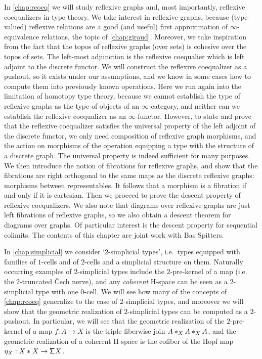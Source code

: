 In \cref{chap:rcoeq} we will study reflexive graphs and, most importantly, reflexive coequalizers in type theory. We take interest in reflexive graphs, because (type-valued) reflexive relations are a good (and useful) first approximation of $\infty$-equivalence relations, the topic of \cref{chap:giraud}. Moreover, we take inspiration from the fact that the topos of reflexive graphs (over sets) is cohesive over the topos of sets. The left-most adjunction is the reflexive coequalier which is left adjoint to the discrete functor. We will construct the reflexive coequalizer as a pushout, so it exists under our assumptions, and we know in some cases how to compute them into previously known operations. Here we run again into the limitation of homotopy type theory, because we cannot establish the type of reflexive graphs as the type of objects of an $\infty$-category, and neither can we establish the reflexive coequalizer as an $\infty$-functor. However, to state and prove that the reflexive coequalizer satisfies the universal property of the left adjoint of the discrete functor, we only need composition of reflexive graph morphisms, and the action on morphisms of the operation equipping a type with the structure of a discrete graph. The universal property is indeed sufficient for many purposes. We then introduce the notion of fibrations for reflexive graphs, and show that the fibrations are right orthogonal to the same maps as the discrete reflexive graphs: morphisms between representables. It follows that a morphism is a fibration if and only if it is cartesian. Then we proceed to prove the descent property of reflexive coequalizers. We also note that diagrams over reflexive graphs are just left fibrations of reflexive graphs, so we also obtain a descent theorem for diagrams over graphs. Of particular interest is the descent property for sequential colimits. The contents of this chapter are joint work with Bas Spitters.

In \cref{chap:simplicial} we consider `$2$-simplicial types', i.e.~types equipped with families of $1$-cells and of $2$-cells and a simplicial structure on them. Naturally occurring examples of $2$-simplicial types include the $2$-pre-kernel of a map (i.e. the $2$-truncated \v Cech nerve), and any \emph{coherent} H-space can be seen as a $2$-simplicial type with one $0$-cell. We will see how many of the concepts of \cref{chap:rcoeq} generalize to the case of $2$-simplicial types, and moreover we will show that the geometric realization of $2$-simplicial types can be computed as a $2$-pushout. In particular, we will see that the geometric realization of the $2$-pre-kernel of a map $f:A\to X$ is the triple fiberwise join $\join[X]{A}{\join[X]{A}{A}}$, and the geometric realization of a coherent H-space is the cofiber of the Hopf map $\eta_X:\join{X}{X}\to \susp X$. 

